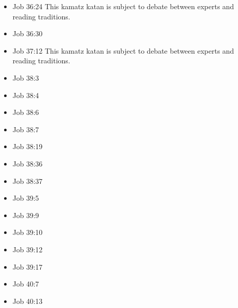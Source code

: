 \documentclass[14pt]{book}
\begin{document}
\begin{multicols}{2}
\begin{itemize}
															\item Job 36:24 This kamatz katan is subject to debate between experts and reading traditions.
															
															\item Job 36:30
															
															\item Job 37:12 This kamatz katan is subject to debate between experts and reading traditions.
															
															\item Job 38:3
															
															\item Job 38:4
															
															\item Job 38:6
															
															\item Job 38:7
															
															\item Job 38:19
															
															\item Job 38:36
															
															\item Job 38:37
															
															\item Job 39:5
															
															\item Job 39:9
															
															\item Job 39:10
															
															\item Job 39:12
															
															\item Job 39:17
															
															\item Job 40:7
															
															\item Job 40:13
															

\end{itemize}
\end{multicols}
\end{document}
